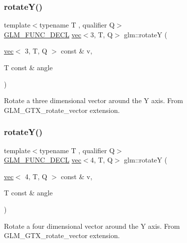 \subsubsection{\texorpdfstring{rotate\+Y()}{rotateY()}\hspace{0.1cm}{\footnotesize\ttfamily [1/2]}}
{\footnotesize\ttfamily template$<$typename T , qualifier Q$>$ \\
\hyperlink{setup_8hpp_ab2d052de21a70539923e9bcbf6e83a51}{G\+L\+M\+\_\+\+F\+U\+N\+C\+\_\+\+D\+E\+CL} \hyperlink{structglm_1_1vec}{vec}$<$3, T, Q$>$ glm\+::rotateY (\begin{DoxyParamCaption}\item[{\hyperlink{structglm_1_1vec}{vec}$<$ 3, T, Q $>$ const \&}]{v,  }\item[{T const \&}]{angle }\end{DoxyParamCaption})}

Rotate a three dimensional vector around the Y axis. From G\+L\+M\+\_\+\+G\+T\+X\+\_\+rotate\+\_\+vector extension. \mbox{\label{group__gtx__rotate__vector_ga3ce3db0867b7f8efd878ee34f95a623b}} 
\subsubsection{\texorpdfstring{rotate\+Y()}{rotateY()}\hspace{0.1cm}{\footnotesize\ttfamily [2/2]}}
{\footnotesize\ttfamily template$<$typename T , qualifier Q$>$ \\
\hyperlink{setup_8hpp_ab2d052de21a70539923e9bcbf6e83a51}{G\+L\+M\+\_\+\+F\+U\+N\+C\+\_\+\+D\+E\+CL} \hyperlink{structglm_1_1vec}{vec}$<$4, T, Q$>$ glm\+::rotateY (\begin{DoxyParamCaption}\item[{\hyperlink{structglm_1_1vec}{vec}$<$ 4, T, Q $>$ const \&}]{v,  }\item[{T const \&}]{angle }\end{DoxyParamCaption})}

Rotate a four dimensional vector around the Y axis. From G\+L\+M\+\_\+\+G\+T\+X\+\_\+rotate\+\_\+vector extension. \mbox{\label{group__gtx__rotate__vector_ga5a048838a03f6249acbacb4dbacf79c4}} 
